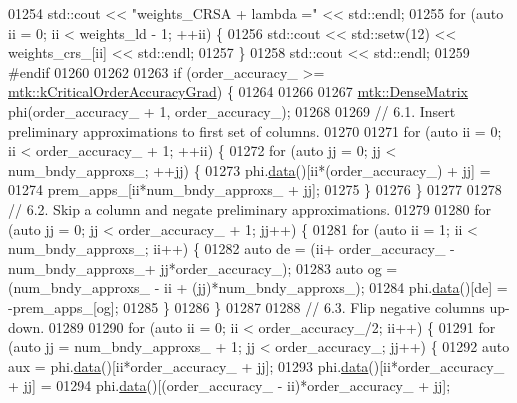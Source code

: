 \begin{DoxyCode}
{{01254   std::cout << \textcolor{stringliteral}{"weights\_CRSA + lambda ="} << std::endl;
01255   \textcolor{keywordflow}{for} (\textcolor{keyword}{auto} ii = 0; ii < weights\_ld - 1; ++ii) \{
01256     std::cout << std::setw(12) << weights\_crs\_[ii] << std::endl;
01257   \}
01258   std::cout << std::endl;
01259 \textcolor{preprocessor}{  #endif}
01260 
01262 
01263   \textcolor{keywordflow}{if} (order\_accuracy\_ >= \hyperlink{group__c01-roots_ga295dd2f403c775ecd942c22b5a777496}{mtk::kCriticalOrderAccuracyGrad}) \{
01264 
01266 
01267     \hyperlink{classmtk_1_1DenseMatrix}{mtk::DenseMatrix} phi(order\_accuracy\_ + 1, order\_accuracy\_);
01268 
01269     \textcolor{comment}{// 6.1. Insert preliminary approximations to first set of columns.}
01270 
01271     \textcolor{keywordflow}{for} (\textcolor{keyword}{auto} ii = 0; ii < order\_accuracy\_ + 1; ++ii) \{
01272       \textcolor{keywordflow}{for} (\textcolor{keyword}{auto} jj = 0; jj < num\_bndy\_approxs\_; ++jj) \{
01273         phi.\hyperlink{classmtk_1_1DenseMatrix_a0c33b8a9e01d157c61ddbdf807c25d84}{data}()[ii*(order\_accuracy\_) + jj] =
01274           prem\_apps\_[ii*num\_bndy\_approxs\_ + jj];
01275       \}
01276     \}
01277 
01278     \textcolor{comment}{// 6.2. Skip a column and negate preliminary approximations.}
01279 
01280     \textcolor{keywordflow}{for} (\textcolor{keyword}{auto} jj = 0; jj < order\_accuracy\_ + 1; jj++) \{
01281       \textcolor{keywordflow}{for} (\textcolor{keyword}{auto} ii = 1; ii < num\_bndy\_approxs\_; ii++) \{
01282         \textcolor{keyword}{auto} de = (ii+ order\_accuracy\_ - num\_bndy\_approxs\_+ jj*order\_accuracy\_);
01283         \textcolor{keyword}{auto} og = (num\_bndy\_approxs\_ - ii + (jj)*num\_bndy\_approxs\_);
01284         phi.\hyperlink{classmtk_1_1DenseMatrix_a0c33b8a9e01d157c61ddbdf807c25d84}{data}()[de] = -prem\_apps\_[og];
01285       \}
01286     \}
01287 
01288     \textcolor{comment}{// 6.3. Flip negative columns up-down.}
01289 
01290     \textcolor{keywordflow}{for} (\textcolor{keyword}{auto} ii = 0; ii < order\_accuracy\_/2; ii++) \{
01291       \textcolor{keywordflow}{for} (\textcolor{keyword}{auto} jj = num\_bndy\_approxs\_ + 1; jj < order\_accuracy\_; jj++) \{
01292         \textcolor{keyword}{auto} aux = phi.\hyperlink{classmtk_1_1DenseMatrix_a0c33b8a9e01d157c61ddbdf807c25d84}{data}()[ii*order\_accuracy\_ + jj];
01293         phi.\hyperlink{classmtk_1_1DenseMatrix_a0c33b8a9e01d157c61ddbdf807c25d84}{data}()[ii*order\_accuracy\_ + jj] =
01294           phi.\hyperlink{classmtk_1_1DenseMatrix_a0c33b8a9e01d157c61ddbdf807c25d84}{data}()[(order\_accuracy\_ - ii)*order\_accuracy\_ + jj];
}}
\end{DoxyCode}
